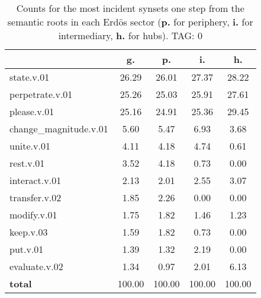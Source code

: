 \begin{table}[h!]
\begin{center}
\begin{tabular}{| l || c | c | c | c |}\hline
 & {\bf g.} & {\bf p.} & {\bf i.} & {\bf h.} \\\hline\hline
state.v.01 & 26.29  & 26.01  & 27.37  & 28.22 \\\hline
perpetrate.v.01 & 25.26  & 25.03  & 25.91  & 27.61 \\\hline
please.v.01 & 25.16  & 24.91  & 25.36  & 29.45 \\\hline
change\_magnitude.v.01 & 5.60  & 5.47  & 6.93  & 3.68 \\\hline
unite.v.01 & 4.11  & 4.18  & 4.74  & 0.61 \\\hline
rest.v.01 & 3.52  & 4.18  & 0.73  & 0.00 \\\hline
interact.v.01 & 2.13  & 2.01  & 2.55  & 3.07 \\\hline
transfer.v.02 & 1.85  & 2.26  & 0.00  & 0.00 \\\hline
modify.v.01 & 1.75  & 1.82  & 1.46  & 1.23 \\\hline
keep.v.03 & 1.59  & 1.82  & 0.73  & 0.00 \\\hline
put.v.01 & 1.39  & 1.32  & 2.19  & 0.00 \\\hline
evaluate.v.02 & 1.34  & 0.97  & 2.01  & 6.13 \\\hline\hline
{{\bf total}} & 100.00  & 100.00  & 100.00  & 100.00 \\\hline
\end{tabular}
\caption{Counts for the most incident synsets one step from the semantic roots in each Erd\"os sector ({\bf p.} for periphery, {\bf i.} for intermediary, {\bf h.} for hubs). TAG: 0}
\end{center}
\end{table}